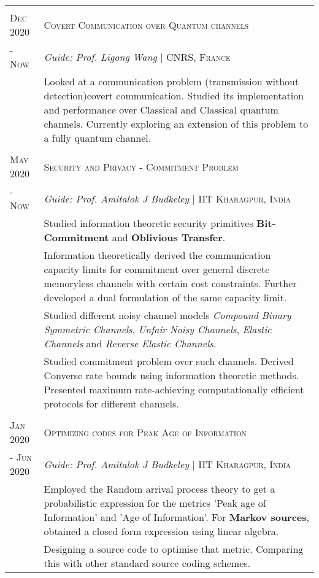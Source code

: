 \documentclass[a4paper,10pt]{article}
\begin{document}
\begin{tabular}{p{1.8cm}|p{15.3cm}}	

	& \\
	
	\centering\textsc{Dec 2020}& \textsc{Covert Communication over Quantum channels} 
	\\\centering \textsc{- Now}&\emph{Guide: Prof. Ligong Wang} | \small{\textsc{CNRS, France}} \\&\footnotesize{ Looked at a communication problem (transmission without detection)covert communication. Studied its implementation and performance over Classical and Classical quantum channels. Currently exploring an extension of this problem to a fully quantum channel. }
	\\& \\
	
	\centering\textsc{May 2020 }& \textsc{Security and Privacy - Commitment Problem}
	\\ \centering \textsc{- Now}&\emph{Guide: Prof. Amitalok J Budkeley} | \small{\textsc{IIT Kharagpur, India}}\\&\footnotesize{ Studied information theoretic security primitives \textbf{Bit-Commitment} and \textbf{Oblivious Transfer}.} \\
	&\footnotesize{ Information theoretically derived the communication capacity limits for commitment over general discrete memoryless channels with certain cost constraints. Further developed a dual formulation of the same capacity limit.}\\
	&\footnotesize{ Studied different noisy channel models \textit{Compound Binary Symmetric Channels}, \textit{Unfair Noisy Channels}, \textit{Elastic Channels} and \textit{Reverse Elastic Channels}.}\\
	&\footnotesize{ Studied commitment problem over such channels. Derived Converse rate bounds using information theoretic methods. Presented maximum rate-achieving computationally efficient protocols for different channels.}
	\\& \\
	
	\centering  \textsc{Jan 2020} & \textsc{Optimizing codes for Peak Age of Information}
	\\ \centering\textsc{- Jun 2020}&\emph{Guide: Prof. Amitalok J Budkeley} | \small{\textsc{IIT Kharagpur, India}}\\ &\footnotesize{ Employed the Random arrival process theory to get a probabilistic expression for the metrics 'Peak age of Information' and 'Age of Information'. For \textbf{Markov sources}, obtained a closed form expression using linear algebra.}\\
	&  \footnotesize{Designing a source code to optimise that metric. Comparing this with other standard source coding schemes.}
\end{tabular}
\end{document}

